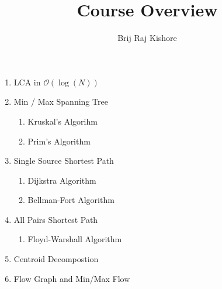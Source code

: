 \documentclass[12pt,twocolumn]{article}
\title{Course Overview}
\date{}
\author{Brij Raj Kishore}
\begin{document}
	\maketitle
		\begin{enumerate}
			\item LCA in $\mathcal{O}(\log(N))$
			\item Min / Max Spanning Tree
				\begin{enumerate}
					\item Kruskal's Algorihm
					\item Prim's Algorithm
				\end{enumerate}
			\item Single Source Shortest Path
				\begin{enumerate}
					\item Dijkstra Algorithm
					\item Bellman-Fort Algorithm
				\end{enumerate}	
			\item All Pairs Shortest Path
				\begin{enumerate}
					\item Floyd-Warshall Algorithm
				\end{enumerate}	
			\item Centroid Decompostion
			\item Flow Graph and Min/Max Flow
			
			
		\end{enumerate}
\end{document}
